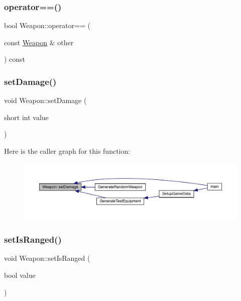 \mbox{\label{class_weapon_a775cb30927bd7d89b9666a1fd9f8ed5f}} 
\subsubsection{\texorpdfstring{operator==()}{operator==()}}
{\footnotesize\ttfamily bool Weapon\+::operator== (\begin{DoxyParamCaption}\item[{const \mbox{\hyperlink{class_weapon}{Weapon}} \&}]{other }\end{DoxyParamCaption}) const}

\mbox{\label{class_weapon_a0c582ba1c1413a4ecda931bb8acff458}} 
\subsubsection{\texorpdfstring{set\+Damage()}{setDamage()}}
{\footnotesize\ttfamily void Weapon\+::set\+Damage (\begin{DoxyParamCaption}\item[{short int}]{value }\end{DoxyParamCaption})}

Here is the caller graph for this function\+:
\nopagebreak
\begin{figure}[H]
\begin{center}
\leavevmode
\includegraphics[width=350pt]{class_weapon_a0c582ba1c1413a4ecda931bb8acff458_icgraph}
\end{center}
\end{figure}
\mbox{\label{class_weapon_a73bb6176d7e535811f30a3ee9df53b8d}} 
\subsubsection{\texorpdfstring{set\+Is\+Ranged()}{setIsRanged()}}
{\footnotesize\ttfamily void Weapon\+::set\+Is\+Ranged (\begin{DoxyParamCaption}\item[{bool}]{value }\end{DoxyParamCaption})}

